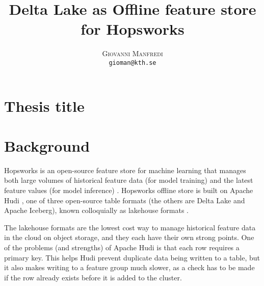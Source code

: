\documentclass[12pt,twoside,english]{article}
\title{Delta Lake as Offline feature store for Hopsworks}
\author{
        \textsc{Giovanni Manfredi}\\
        \normalsize
            \texttt{gioman@kth.se}
}
\makeatletter
\let\mytitle\@title
\makeatother
\begin{document}
\maketitle







\section{Thesis title}
\mytitle

\section{Background}
\label{sect:background}

Hopsworks is an open-source feature store for machine learning that manages both large volumes of historical feature data (for model training) and the latest feature values (for model inference) \cite{HopsworksBatchRealtime2024, More862135}. Hopsworks offline store is built on Apache Hudi \cite{GebretsadkanKidane1413103}, one of three open-source table formats (the others are Delta Lake and Apache Iceberg), known colloquially as lakehouse formats \cite{lakehouse2021}. 

The lakehouse formats are the lowest cost way to manage historical feature data in the cloud on object storage, and they each have their own strong points. One of the problems (and strengths) of Apache Hudi is that each row requires a primary key. This helps Hudi prevent duplicate data being written to a table, but it also makes writing to a feature group much slower, as a check has to be made if the row already exists before it is added to the cluster. 
\end{document}
